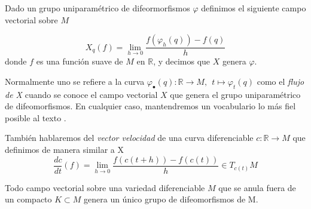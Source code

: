 \bigskip

Dado un grupo uniparamétrico de difeormorfismos $\varphi$ definimos el siguiente campo vectorial sobre $M$

\begin{equation*}
    X_q(f)=\lim_{h\to 0}\frac{f(\varphi_h(q))-f(q)}{h}
\end{equation*}
donde $f$ es una función suave de $M$ en $\mathbb{R}$, y decimos que $X$ genera $\varphi$.

Normalmente uno se refiere a la curva $\varphi_\bullet(q): \mathbb{R}\to M,~~ t\mapsto \varphi_t(q)$ como el \textit{flujo de X} cuando se conoce el campo vectorial $X$ que genera el grupo uniparamétrico de difeomorfismos. En cualquier caso, mantendremos un vocabulario lo más fiel posible al texto \cite{milnor1963}.

También hablaremos del \textit{vector velocidad} de una curva diferenciable $c:\mathbb{R}\to M$ que definimos de manera similar a X
\begin{equation*}
    \frac{dc}{dt}(f)= \lim_{h\to 0}\frac{f(c(t+h))-f(c(t))}{h}\in T_{c(t)}M 
\end{equation*} 

\bigskip
\begin{lemma}
\label{unidiff}
    Todo campo vectorial sobre una variedad diferenciable $M$ que se anula fuera de un compacto $K\subset M$ genera un único grupo de difeomorfismos de M.
\end{lemma}


